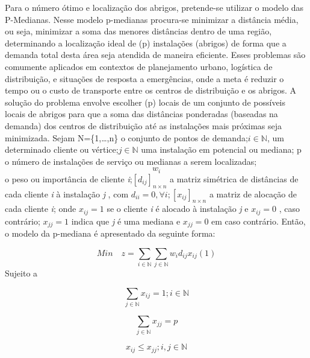 \documentclass[
]{article}
\begin{document}
Para o número ótimo e localização dos abrigos, pretende-se utilizar o
modelo das P-Medianas. Nesse modelo p-medianas procura-se minimizar a
distância média, ou seja, minimizar a soma das menores distâncias dentro
de uma região, determinando a localização ideal de (p) instalações
(abrigos) de forma que a demanda total desta área seja atendida de
maneira eficiente. Esses problemas são comumente aplicados em contextos
de planejamento urbano, logística de distribuição, e situações de
resposta a emergências, onde a meta é reduzir o tempo ou o custo de
transporte entre os centros de distribuição e os abrigos. A solução do
problema envolve escolher (p) locais de um conjunto de possíveis locais
de abrigos para que a soma das distâncias ponderadas (baseadas na
demanda) dos centros de distribuição até as instalações mais próximas
seja minimizada. Sejam N=\{1,\ldots,n\} o conjunto de pontos de
demanda;\(i \in \mathbb{N}\), um determinado cliente ou
vértice;\(j \in \mathbb{N}\) uma instalação em potencial ou mediana; p o
número de instalações de serviço ou medianas a serem localizadas;
\[w_i\] o peso ou importância de cliente
\emph{i};\([d_{ij}]_{n \times n}\) a matriz simétrica de distâncias de
cada cliente \emph{i} à instalação \emph{j} , com
\(d_{ii}=0, \forall i; [x_{ij}]_{n \times n}\) a matriz de alocação de
cada cliente \emph{i}; onde \(x_{ij}=1\) se o cliente \emph{i} é alocado
à instalação \emph{j} e \(x_{ij}=0\) , caso contrário; \(x_{jj}=1\)
indica que \emph{j} é uma mediana e \(x_{jj}=0\) em caso contrário.
Então, o modelo da p-mediana é apresentado da seguinte forma:

\[
Min \quad  z=\sum_{i \in \mathbb{N}} \sum_{j \in \mathbb{N}} w_{i}d_{ij}x_{ij}    (1)
\] Sujeito a

\[
\sum_{j \in \mathbb{N}}x_{ij}=1; i \in \mathbb{N}
\]

\[
\sum_{j \in \mathbb{N}}x_{jj}=p
\]

\[
x_{ij} \leq x_{jj}; i,j \in \mathbb{N}
\]
\end{document}
